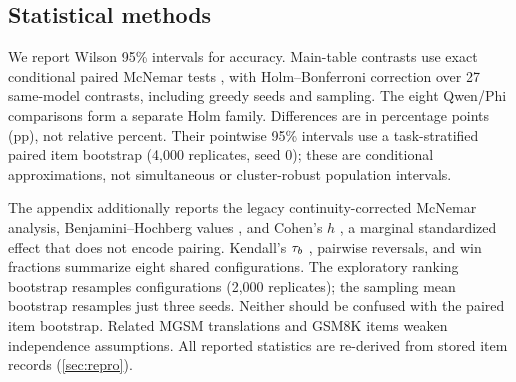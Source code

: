 \subsection{Statistical methods}
We report Wilson 95\% intervals \citep{wilson1927probable} for accuracy.
Main-table contrasts use exact conditional paired McNemar tests
\citep{mcnemar1947note}, with Holm--Bonferroni correction
\citep{holm1979simple} over 27 same-model contrasts, including greedy
seeds and sampling. The eight Qwen/Phi comparisons form a separate Holm
family. Differences are in percentage points (pp), not relative percent.
Their pointwise 95\% intervals use a task-stratified paired item bootstrap
(4,000 replicates, seed 0); these are conditional approximations, not
simultaneous or cluster-robust population intervals.

The appendix additionally reports the legacy continuity-corrected McNemar
analysis, Benjamini--Hochberg values \citep{benjamini1995controlling}, and
Cohen's $h$ \citep{cohen1988statistical}, a marginal standardized effect
that does not encode pairing. Kendall's $\tau_b$ \citep{kendall1938new},
pairwise reversals, and win fractions summarize eight shared configurations.
The exploratory ranking bootstrap resamples configurations (2,000
replicates); the sampling mean bootstrap resamples just three seeds.
Neither should be confused with the paired item bootstrap. Related MGSM
translations and GSM8K items weaken independence assumptions. All reported
statistics are re-derived from stored item records (\cref{sec:repro}).



